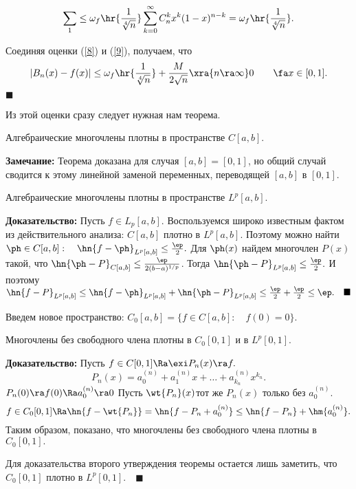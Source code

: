 \documentclass[a4paper]{article}
\begin{document}
\begin{equation}\label{9}
\sum_1\le\omega_f\hr{\frac1{\sqrt[4]{n}}}\sum_{k=0}^{\infty}C_n^k
x^k(1-x)^{n-k}=\omega_f\hr{\frac1{\sqrt[4]{n}}}.
\end{equation}

Соединяя оценки (\ref{8}) и (\ref{9}), получаем, что
\begin{equation*}
|B_n(x)-f(x)|\le\omega_f\hr{\frac1{\sqrt[4]{n}}}+\frac
{M}{2\sqrt{n}}\xra{n\ra\infty} 0\qquad\fa
x\in[0,1].
\end{equation*}
$\blacksquare$

Из этой оценки сразу следует нужная нам теорема.
\begin{theorems}[Вейерштрасс]
Алгебраические многочлены плотны в пространстве $C[a,b]$.
\end{theorems}

\noindent\textbf{Замечание:} Теорема доказана для случая
$[a,b]=[0,1]$, но общий случай сводится к этому линейной заменой
переменных, переводящей $[a,b]$ в $[0,1]$.

\begin{theorems} Алгебраические многочлены плотны в
пространстве $L^p[a,b]$.
\end{theorems}
\textbf{Доказательство:} Пусть $f\in L_p[a,b]$. Воспользуемся
широко известным фактом из действительного анализа: $C[a,b]$
плотно в $L^p[a,b]$. Поэтому можно найти $\ph\in C[a,b]:\quad
\hn{f-\ph}_{L^p[a,b]}\le\frac{\ep}{2}.$ Для $\ph(x)$
найдем многочлен $P(x)$ такой, что
$\hn{\ph-P}_{C[a,b]}\le\frac{\ep}{2(b-a)^{1/p}}$. Тогда
$\hn{\ph-P}_{L^p[a,b]}\le\frac{\ep}2.$ И поэтому
$\hn{f-P}_{L^p[a,b]}\le\hn{f-\ph}_{L^p[a,b]}+\hn{\ph-P}_{L^p[a,b]}\le\frac{\ep}2+\frac{\ep}2\le\ep.\quad\blacksquare$

\medskip Введем новое пространство: $C_0[a,b]=\{f\in C[a,b]:\quad f(0)=0\}$.

\begin{theorems}
Многочлены без свободного члена плотны в $C_0[0,1]$ и в
$L^p[0,1]$.
\end{theorems}
\textbf{Доказательство:} Пусть $f\in C[0,1]\Ra\exi
P_n(x)\ra f.$
$$P_n(x)=a_0^{(n)}+a_1^{(n)}x+\ldots+a_{k_n}^{(n)}x^{k_n}.$$
$P_n(0)\ra f(0)\Ra a_0^{(n)}\ra 0$ Пусть
$\wt{P_n}(x)$\т тот же $P_n(x)$ только без $a_0^{(n)}$.
$$f\in
C_0[0,1]\Ra\hn{f-\wt{P_n}}=\hn{f-P_n+a_0^{(n)}}\le\hn{f-P_n}+\hm{a_0^{(n)}}.$$
Таким образом, показано, что многочлены без свободного члена
плотны в $C_0[0,1].$

Для доказательства второго утверждения теоремы остается лишь
заметить, что $C_0[0,1]$ плотно в $L^p[0,1].\quad\blacksquare$
\end{document}
